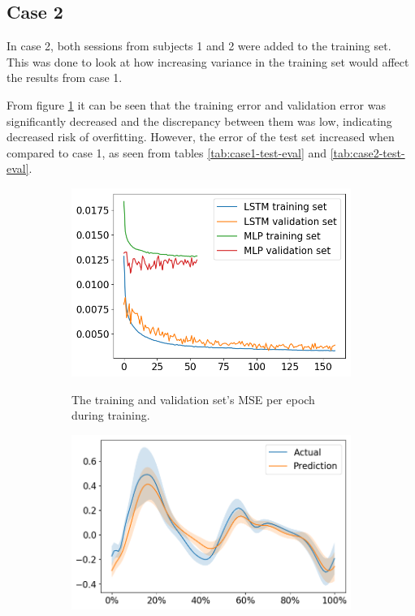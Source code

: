\documentclass[../main.tex]{subfiles}
\begin{document}
\subsection{Case 2}
\label{sec:results-case2}
In case 2, both sessions from subjects 1 and 2 were added to the training set.
This was done to look at how increasing variance in the training set would affect the results from case 1.

From figure \ref{fig:case2-training-performance} it can be seen that the training error and validation error was significantly decreased and the discrepancy between them was low, indicating decreased risk of overfitting.
However, the error of the test set increased when compared to case 1, as seen from tables \ref{tab:case1-test-eval} and \ref{tab:case2-test-eval}.
\begin{figure}[!htb]
    \captionsetup[subfigure]{aboveskip=-12pt}
     \centering
     \begin{subfigure}[b]{0.475\textwidth}
         \centering
         \includegraphics[width=\textwidth]{img/results/training_history/Case2_LSTMvsMLP_training.png}
         \label{fig:case2-training-performance}
         \caption{The training and validation set's \ac{MSE} per epoch during training.}
     \end{subfigure}
     \hfill
     \begin{subfigure}[b]{0.515\textwidth}
         \centering
         \includegraphics[width=\textwidth]{img/results/test_prediction_evaluation/Case2_LSTM_test_prediction.png}

\end{subfigure}
\end{figure}
\end{document}
